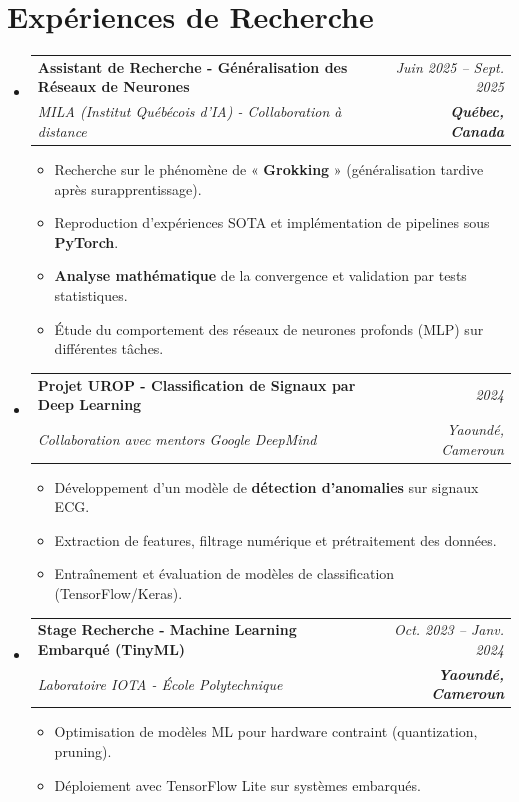 \documentclass[a4paper,11pt]{article}
\makeatletter
\newcommand{\resumeSubheading}[4]{
  \vspace{-1pt}\item
    \begin{tabular*}{0.97\textwidth}[t]{l@{\extracolsep{\fill}}r}
      \textbf{#1} & \textit{\small #2} \\
      \textit{\small #3} & \textit{\small #4} \\
    \end{tabular*}\vspace{-5pt}
}
\makeatother
\begin{document}
\section{Expériences de Recherche}
\begin{itemize}[leftmargin=*, label={}]

    \resumeSubheading
      {Assistant de Recherche - Généralisation des Réseaux de Neurones}{Juin 2025 -- Sept. 2025}
      {MILA (Institut Québécois d'IA) - Collaboration à distance}{\textbf{Québec, Canada}}
      \begin{itemize}[leftmargin=0.4cm, nosep, label=\tiny$\bullet$]
        \item \small{Recherche sur le phénomène de « \textbf{Grokking} » (généralisation tardive après surapprentissage).}
        \item \small{Reproduction d'expériences SOTA et implémentation de pipelines sous \textbf{PyTorch}.}
        \item \small{\textbf{Analyse mathématique} de la convergence et validation par tests statistiques.}
        \item \small{Étude du comportement des réseaux de neurones profonds (MLP) sur différentes tâches.}
      \end{itemize}
    \vspace{2pt}

    \resumeSubheading
      {Projet UROP - Classification de Signaux par Deep Learning}{2024}
      {Collaboration avec mentors Google DeepMind}{Yaoundé, Cameroun}
      \begin{itemize}[leftmargin=0.4cm, nosep, label=\tiny$\bullet$]
        \item \small{Développement d'un modèle de \textbf{détection d'anomalies} sur signaux ECG.}
        \item \small{Extraction de features, filtrage numérique et prétraitement des données.}
        \item \small{Entraînement et évaluation de modèles de classification (TensorFlow/Keras).}
      \end{itemize}
    \vspace{2pt}

    \resumeSubheading
      {Stage Recherche - Machine Learning Embarqué (TinyML)}{Oct. 2023 -- Janv. 2024}
      {Laboratoire IOTA - École Polytechnique}{\textbf{Yaoundé, Cameroun}}
      \begin{itemize}[leftmargin=0.4cm, nosep, label=\tiny$\bullet$]
        \item \small{Optimisation de modèles ML pour hardware contraint (quantization, pruning).}
        \item \small{Déploiement avec TensorFlow Lite sur systèmes embarqués.}
      \end{itemize}
\end{itemize}
\end{document}
